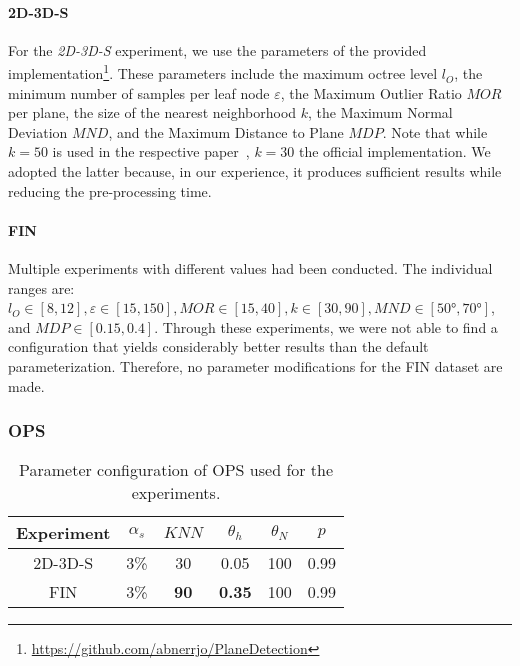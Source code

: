 \documentclass[main.tex]{subfiles}
\begin{document}
\paragraph{2D-3D-S}
For the \textit{2D-3D-S} experiment, we use the parameters of the provided implementation\footnote{\href{https://github.com/abnerrjo/PlaneDetection}{https://github.com/abnerrjo/PlaneDetection}}. These parameters include the maximum octree level $l_O$,
the minimum number of samples per leaf node $\varepsilon$, the Maximum Outlier Ratio $MOR$ per plane, the size of the nearest neighborhood $k$,
the Maximum Normal Deviation $MND$, and the Maximum Distance to Plane $MDP$. Note that while $k=50$ is used in the respective paper~\cite[Section~3.3]{Araújo_Oliveira_2020},
$k=30$ the official implementation. We adopted the latter because, in our experience, it produces sufficient results while reducing the pre-processing time.

\paragraph{FIN}
Multiple experiments with different values had been conducted. The individual ranges are: $l_O \in [8,12], \varepsilon \in [15, 150],
    MOR \in [15, 40], k \in [30, 90], MND \in [50°, 70°]$, and $MDP \in [0.15, 0.4]$.
Through these experiments, we were not able to find a configuration that yields considerably better results than the default
parameterization. Therefore, no parameter modifications for the FIN dataset are made.


\subsubsection{OPS}

\begin{table}[H]
    \centering
    \begin{tabular}{c|ccccc}
        Experiment & $\alpha_s$ & $KNN$       & $\theta_{h}$  & $\theta_{N}$ & $p$  \\ \hline
        2D-3D-S    & 3\%        & 30          & 0.05          & 100          & 0.99 \\
        FIN        & 3\%        & \textbf{90} & \textbf{0.35} & 100          & 0.99
    \end{tabular}%
    \caption{Parameter configuration of OPS used for the experiments.}
    \label{tab:ops-param}
\end{table}
\end{document}
